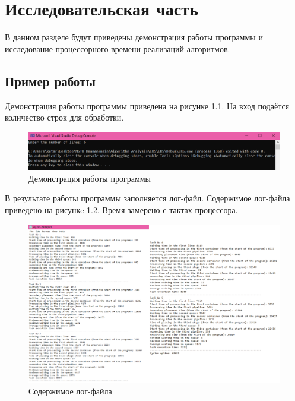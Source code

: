 \documentclass[12pt]{report}
\begin{document}
\chapter{Исследовательская часть}

В данном разделе будут приведены демонстрация работы программы и исследование процессорного времени реализаций алгоритмов.

\section{Пример работы}

Демонстрация работы программы приведена на рисунке \ref{fig:prog_show}. На вход подаётся количество строк для обработки.

\begin{figure}[h]
	\begin{center}
	\includegraphics[scale=0.8]{example.png}
	 \caption{Демонстрация работы программы}
	 \label{fig:prog_show}
	\end{center}
\end{figure}

В результате работы программы заполняется лог-файл. Содержимое лог-файла приведено на рисункe \ref{fig:log1}. Время замерено с тактах процессора.

\begin{figure}[h]
	\begin{center}
		\includegraphics[scale=0.5]{logs.png}
		\caption{Содержимое лог-файла}
		\label{fig:log1}
	\end{center}
\end{figure}
\newpage
\end{document}
